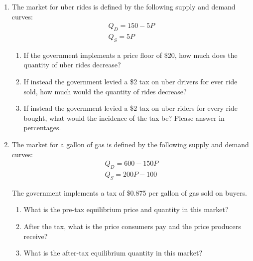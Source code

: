 \documentclass{article}
\begin{document}
\begin{enumerate}
	If the government implements a price ceiling of \$300, how much does the quantity of tutoring decrease?
	
\item The market for uber rides is defined by the following supply and demand curves:
	\begin{gather*}
	Q_D = 150 - 5P \\
	Q_S = 5P
	\end{gather*}
	
	\begin{enumerate}
	
	\item If the government implements a price floor of \$20, how much does the quantity of uber rides decrease?
	
	\item If instead the government levied a \$2 tax on uber drivers for ever ride sold, how much would the quantity of rides decrease?
	
	\item If instead the government levied a \$2 tax on uber riders for every ride bought, what would the incidence of the tax be? Please answer in percentages.
	
	\end{enumerate}
	
\item The market for a gallon of gas is defined by the following supply and demand curves:
	\begin{gather*}
	Q_D = 600 - 150P \\
	Q_S = 200P - 100
	\end{gather*}
	
	The government implements a tax of \$0.875 per gallon of gas sold on buyers. 
	
	\begin{enumerate}
	
	\item What is the pre-tax equilibrium price and quantity in this market?
	
	\item After the tax, what is the price consumers pay and the price producers receive?
	
	\item What is the after-tax equilibrium quantity in this market? 
	
	\end{enumerate}
	
\end{enumerate}
\end{document}
